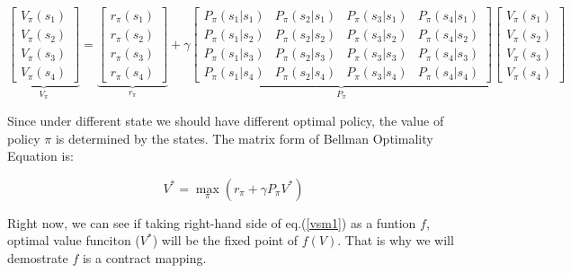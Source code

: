 \begin{equation*}
    \underbrace{\begin{bmatrix}
        V_{\pi}(s_{1}) \\
        V_{\pi}(s_{2})  \\
        V_{\pi}(s_{3}) \\
        V_{\pi}(s_{4})
    \end{bmatrix}}_{V_{\pi}}=
    \underbrace{\begin{bmatrix}
        r_{\pi}(s_{1}) \\
        r_{\pi}(s_{2})  \\
        r_{\pi}(s_{3}) \\
        r_{\pi}(s_{4})
    \end{bmatrix}}_{r_{\pi}}+\gamma
    \underbrace{\begin{bmatrix}
        P_{\pi}(s_{1}|s_{1}) & P_{\pi}(s_{2}|s_{1}) & P_{\pi}(s_{3}|s_{1}) & P_{\pi}(s_{4}|s_{1}) \\
        P_{\pi}(s_{1}|s_{2}) & P_{\pi}(s_{2}|s_{2}) & P_{\pi}(s_{3}|s_{2}) & P_{\pi}(s_{4}|s_{2}) \\
        P_{\pi}(s_{1}|s_{3}) & P_{\pi}(s_{2}|s_{3}) & P_{\pi}(s_{3}|s_{3}) & P_{\pi}(s_{4}|s_{3}) \\
        P_{\pi}(s_{1}|s_{4}) & P_{\pi}(s_{2}|s_{4}) & P_{\pi}(s_{3}|s_{4}) & P_{\pi}(s_{4}|s_{4})
    \end{bmatrix}}_{P_{\pi}}
    \begin{bmatrix}
        V_{\pi}(s_{1}) \\
        V_{\pi}(s_{2})  \\
        V_{\pi}(s_{3}) \\
        V_{\pi}(s_{4})
    \end{bmatrix}
\end{equation*}

Since under different state we should have different optimal policy,  the value of policy $\pi$ is determined by the states. The matrix form of Bellman Optimality Equation is:

\begin{equation}\label{vsm1}
    V^*=\max_{\pi}\left(r_{\pi}+\gamma P_{\pi}V^*\right)
\end{equation}

Right now, we can see if taking right-hand side of eq.(\ref{vsm1}) as a funtion $f$, optimal value funciton ($V^*$) will be the fixed point of $f(V)$. That is why we will demostrate $f$ is a contract mapping. \par

